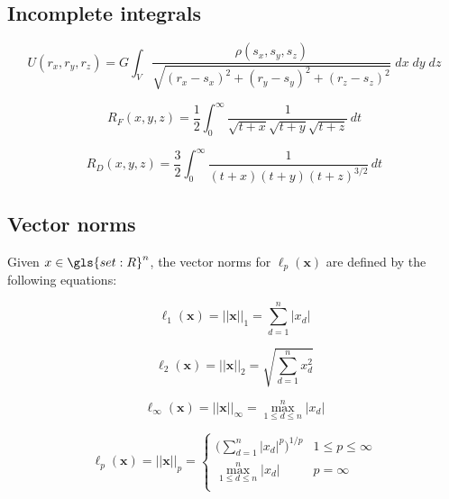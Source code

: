 \subsection{Incomplete integrals\label{appendix:incomplete_integrals}}

\begin{equation}
    U(r_x, r_y, r_z) = G\int_V\frac{\rho{(s_x,s_y,s_z)}}{\sqrt{(r_x-s_x)^2+(r_y-s_y)^2+(r_z-s_z)^2}}\;dx\;dy\;dz
    \label{eq:ur-gen-rect}
\end{equation}

\begin{equation}
    R_F\!\left(x, y, z\right) = \frac{1}{2} \int_{0}^{\infty} \frac{1}{\sqrt{t + x} \sqrt{t + y} \sqrt{t + z}} \, dt
    \label{eq:elliptic_RF}
\end{equation}

\begin{equation}
    R_D\!\left(x, y, z\right) = \frac{3}{2} \int_{0}^{\infty} \frac{1}{\left(t + x\right) \left(t + y\right) {\left(t + z\right)}^{3 / 2}} \, dt
    \label{eq:elliptic_RD}
\end{equation}



\subsection{Vector norms\label{appendix:vector_norms}}
Given $x\in\gls{set:R}^n$, the vector norms for $\ell_p(\mathbf{x})$ are defined
by the following equations:

\begin{equation}
    \ell_1(\mathbf{x})=||\mathbf{x}||_1 = \sum_{d=1}^n |x_d|
\end{equation}

\begin{equation}
    \ell_2(\mathbf{x})=||\mathbf{x}||_2 = \sqrt{\sum_{d=1}^n x_d^2}
\end{equation}

\begin{equation}
    \ell_\infty(\mathbf{x})=||\mathbf{x}||_\infty = \max_{1\leq{d}\leq{n}}^n |x_d|
\end{equation}

\begin{equation}
    \ell_p(\mathbf{x})=||\mathbf{x}||_p=
    \begin{cases}
        \bigg(\sum_{d=1}^n |x_d|^p\bigg)^{1/p}    &  1\leq{}p\le \infty \\
        \max_{1\leq{d}\leq{n}}^n |x_d|            &  p=\infty \\
    \end{cases}
    \label{eq:ell-p}
\end{equation}


